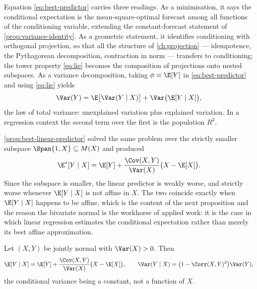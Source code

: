 Equation \eqref{eq:best-predictor} carries three readings. As a minimisation, it says the conditional expectation is the mean-square-optimal
forecast among all functions of the conditioning variable, extending the
constant-forecast statement of \autoref{prop:variance-identity}. As a geometric
statement, it identifies conditioning with orthogonal projection, so that all the
structure of \autoref{ch:projection} --- idempotence, the Pythagorean
decomposition, contraction in norm --- transfers to conditioning; the tower
property \eqref{eq:lie} becomes the composition of projections onto nested
subspaces. As a variance decomposition, taking $\phi\equiv\E[Y]$ in
\eqref{eq:best-predictor} and using \eqref{eq:lie} yields
\begin{equation}\label{eq:variance-decomposition}
	\Var(Y)=\E\bigl[\Var(Y\mid X)\bigr]+\Var\bigl(\E[Y\mid X]\bigr),
\end{equation}
the law of total variance: unexplained variation plus explained variation. In a
regression context the second term over the first is the population $R^{2}$.

\begin{remark}\label{rem:linear-vs-general}
	\autoref{prop:best-linear-predictor} solved the same problem over the strictly
	smaller subspace $\Span\{1,X\}\subseteq M(X)$ and produced
	\begin{equation}\label{eq:blp-again}
		\E^{\ast}[Y\mid X]=\E[Y]+\frac{\Cov(X,Y)}{\Var(X)}\bigl(X-\E[X]\bigr).
	\end{equation}
	Since the subspace is smaller, the linear predictor is weakly worse, and
	strictly worse whenever $\E[Y\mid X]$ is not affine in $X$. The two coincide
	exactly when $\E[Y\mid X]$ happens to be affine, which is the content of the
	next proposition and the reason the bivariate normal is the workhorse of applied
	work: it is the case in which linear regression estimates the conditional
	expectation rather than merely its best affine approximation.
\end{remark}

\begin{proposition}\label{prop:bivariate-normal}
	Let $(X,Y)$ be jointly normal with $\Var(X)>0$. Then
	\begin{equation}\label{eq:gaussian-conditional}
		\E[Y\mid X]=\E[Y]+\frac{\Cov(X,Y)}{\Var(X)}\bigl(X-\E[X]\bigr),
		\qquad
		\Var(Y\mid X)=\bigl(1-\Corr(X,Y)^{2}\bigr)\Var(Y),
	\end{equation}
	the conditional variance being a constant, not a function of $X$.
\end{proposition}

